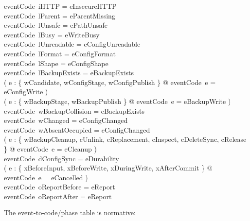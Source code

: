\documentclass{article}
\begin{document}
\begin{axdef}
	eventCode~iHTTP = eInsecureHTTP \\
	eventCode~lParent = eParentMissing \\
	eventCode~lUnsafe = ePathUnsafe \\
	eventCode~lBusy = eWriteBusy \\
	eventCode~lUnreadable = eConfigUnreadable \\
	eventCode~lFormat = eConfigFormat \\
	eventCode~lShape = eConfigShape \\
	eventCode~lBackupExists = eBackupExists \\
	( \forall e : \{ wCandidate, wConfigStage, wConfigPublish \} @
	eventCode~e = eConfigWrite ) \\
	( \forall e : \{ wBackupStage, wBackupPublish \} @
	eventCode~e = eBackupWrite ) \\
	eventCode~wBackupCollision = eBackupExists \\
	eventCode~wChanged = eConfigChanged \\
	eventCode~wAbsentOccupied = eConfigChanged \\
	( \forall e : \{ wBackupCleanup, cUnlink, cReplacement, cInspect,
	cDeleteSync, cRelease \} @ eventCode~e = eCleanup ) \\
	eventCode~dConfigSync = eDurability \\
	( \forall e : \{ xBeforeInput, xBeforeWrite, xDuringWrite, xAfterCommit \} @
	eventCode~e = eCancelled ) \\
	eventCode~oReportBefore = eReport \\
	eventCode~oReportAfter = eReport
\end{axdef}

The event-to-code/phase table is normative:
\end{document}
